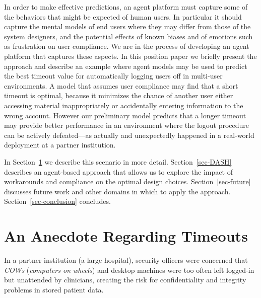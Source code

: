 \documentclass{acm_proc_article-sp}
\newcommand{\secref}[1] {Section~\ref{sec-#1}}
\newcommand{\ignore}[1] {}
\begin{document}
In order to make effective predictions, an agent platform must capture
some of the behaviors that might be expected of human users. In
particular it should capture the mental models of end users where they
may differ from those of the system designers, and the potential
effects of known biases and of emotions such as frustration on user
compliance.  We are in the process of developing an agent platform
that captures these aspects. In this position paper we briefly present
the approach and describe an example where agent models may be used to
predict the best timeout value for automatically logging users off in
multi-user environments.  A model that assumes user compliance may
find that a short timeout is optimal, because it minimizes the chance
of another user either accessing material inappropriately or
accidentally entering information to the wrong account. However our preliminary
model predicts that a longer timeout may provide better performance in
an environment where the logout procedure can be actively
defeated---as actually and unexpectedly happened in a real-world
deployment at a partner institution.

In \secref{timeouts} we describe this scenario in more
detail. \secref{DASH} describes an agent-based approach that allows us
to explore the impact of workarounds and compliance on the optimal
design choices. \secref{future} discusses future work and other
domains in which to apply the approach. \secref{conclusion} concludes.

\section{An Anecdote Regarding Timeouts}
\label{sec-timeouts}


In a partner institution (a large hospital), security officers were concerned
that {\em COWs} ({\em computers on wheels}) and desktop machines were 
too often left logged-in but unattended by clinicians, creating
the risk for confidentiality and integrity problems in stored patient data.

\ignore{In a partner institution (a large hospital),
clinicians used {\em COWs} ({\em computers on wheels}) and desktop machines.
The security officers were concerned
that these systems were too often left logged-in but unattended, creating
the risk for confidentiality and integrity problems in stored patient data.}
\end{document}
